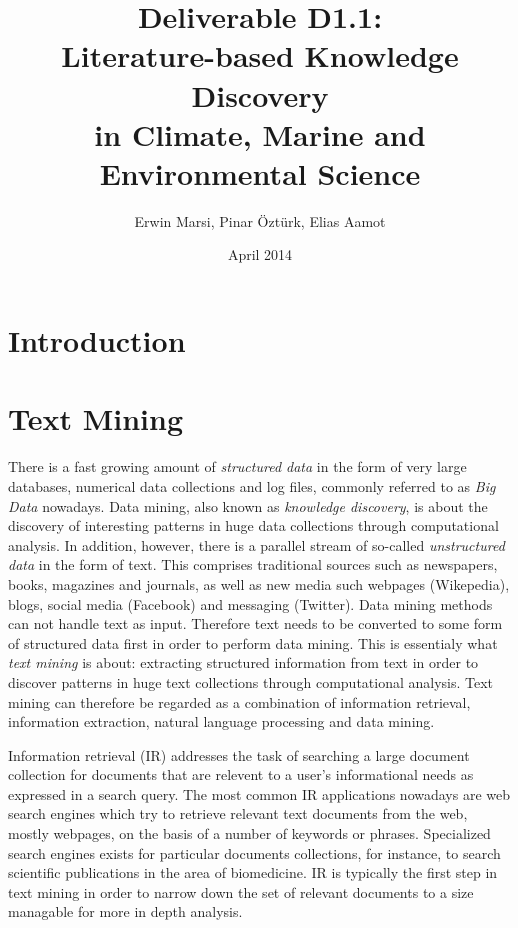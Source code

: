 \documentclass[11pt,twoside,a4paper]{report}
\begin{document}
\title{Deliverable D1.1:\\ Literature-based Knowledge Discovery\\in Climate, Marine and Environmental Science}
\author{Erwin Marsi, Pinar \"Ozt\"urk, Elias Aamot}
\date{April 2014}
\maketitle

\abstract{}

\chapter{Introduction}


\chapter{Text Mining}


There is a fast growing amount of \emph{structured data} in the form of very large databases, numerical data collections and log files, commonly referred to as \emph{Big Data} nowadays.
Data mining, also known as \emph{knowledge discovery}, is about the discovery of interesting patterns in huge data collections through computational analysis.
In addition, however, there is a parallel stream of so-called \emph{unstructured data} in the form of text.
This comprises traditional sources such as newspapers, books, magazines and journals, as well as new media such webpages (Wikepedia), blogs, social media (Facebook) and messaging (Twitter).
Data mining methods can not handle text as input.
Therefore text needs to be converted to some form of structured data first in order to perform data mining.
This is essentialy what \emph{text mining} is about: extracting structured information from text in order to discover patterns in huge text collections through computational analysis.
Text mining can therefore be regarded as a combination of information retrieval, information extraction, natural language processing and data mining.

Information retrieval (IR) addresses the task of searching a large document collection for documents that are relevent to a user's informational needs as expressed in a search query. 
The most common IR applications nowadays are web search engines which try to retrieve relevant text documents from the web, mostly webpages, on the basis of a number of keywords or phrases.
Specialized search engines exists for particular documents collections, for instance, to search scientific publications in the area of biomedicine.
IR is typically the first step in text mining in order to narrow down the set of relevant documents to a size managable for more in depth analysis.
\end{document}
